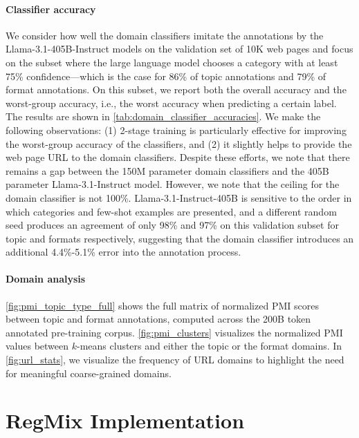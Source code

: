 \paragraph{Classifier accuracy} We consider how well the domain classifiers imitate the annotations by the Llama-3.1-405B-Instruct models on the validation set of 10K web pages and focus on the subset where the large language model chooses a category with at least 75\% confidence---which is the case for 86\% of topic annotations and 79\% of format annotations.
On this subset, we report both the overall accuracy and the worst-group accuracy, i.e., the worst accuracy when predicting a certain label.
The results are shown in \autoref{tab:domain_classifier_accuracies}. We make the following observations: (1) 2-stage training is particularly effective for improving the worst-group accuracy of the classifiers, and (2) it slightly helps to provide the web page URL to the domain classifiers. Despite these efforts, we note that there remains a gap between the 150M parameter domain classifiers and the 405B parameter Llama-3.1-Instruct model. However, we note that the ceiling for the domain classifier is not 100\%. Llama-3.1-Instruct-405B is sensitive to the order in which categories and few-shot examples are presented, and a different random seed produces an agreement of only 98\% and 97\% on this validation subset for topic and formats respectively, suggesting that the domain classifier introduces an additional 4.4\%-5.1\% error into the annotation process.

\paragraph{Domain analysis}
\autoref{fig:pmi_topic_type_full} shows the full matrix of normalized PMI scores between topic and format annotations, computed across the 200B token annotated pre-training corpus. \autoref{fig:pmi_clusters} visualizes the normalized PMI values between $k$-means clusters and either the topic or the format domains.
In \autoref{fig:url_stats}, we visualize the frequency of URL domains to highlight the need for meaningful coarse-grained domains.









\section{RegMix Implementation} \label{app:regmix}

